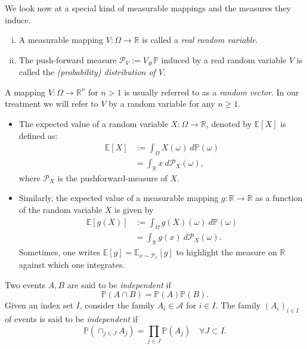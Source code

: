 We look now at a special kind of measurable mappings and the measures they induce.
\begin{definition}
	\label{def:RV}
	\begin{enumerate}[(i)] Let $(\Omega,\mathcal{A}, \mathbb{P})$ be a probability measure space.
		\item A measurable mapping $V: \Omega \to \mathbb{R}$ is called a \emph{real random variable}.
		\item The push-forward measure $\mathcal{P}_V := V_\# \mathbb{P}$ induced by a real random variable $V$ 
		is called the \emph{(probability) distribution of $V$}.		
	\end{enumerate}
\end{definition}
A mapping $V: \Omega \to \mathbb{R}^n$ for $n>1$ is usually referred to as a
\emph{random vector}. In our treatment we will refer to $V$ by a random variable
for any $n\geq 1$. 
\begin{definition}
	\begin{itemize}
		\item The expected value of a random variable $X: \Omega \to
		\mathbb{R}$, denoted by $\mathbb{E}[X]$
		is defined as:
		\begin{align*}
			\mathbb{E}[X] &:= \int_\Omega X(\omega) \ d\mathbb{P}(\omega) \\
			& = \int_\mathbb{R} x \ d\mathcal{P}_X(\omega),
		\end{align*}
		where $\mathcal{P}_X$ is the pushforward-measure of $X$.
		\item Similarly, the expected value of a measurable mapping $g:
		\mathbb{R}\to \mathbb{R}$ as a function of the random variable $X$ is given by 
		\begin{align*}
			\mathbb{E}[g(X)] &:= \int_\Omega g(X)(\omega) \ d\mathbb{P}(\omega) \\
			& = \int_\mathbb{R} g(x) \ d\mathcal{P}_X(\omega).
		\end{align*}
		Sometimes, one writes $\mathbb{E}[g] = \mathbb{E}_{x \sim \mathcal{P}_x}[g]$
		to highlight the measure on $\mathbb{R}$ against which one integrates.
	\end{itemize}
\end{definition}


\begin{definition}
Two events $A,B$ are said to be \emph{independent} if $$\mathbb{P}(A \cap B) = \mathbb{P}(A)\mathbb{P}(B).$$ Given 
an index set $I$, consider the family $A_i \in \mathcal{A}$ for $i \in I$. The
family $(A_i)_{i\in I}$ of events is said to be \emph{independent}
if $$\mathbb{P}(\cap_{j \in J} A_j) = \prod_{j \in J} \mathbb{P}(A_j) \quad \forall J \subset I.$$	
\end{definition}

